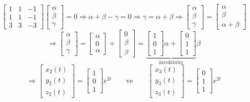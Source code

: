 \documentclass[11pt,a4paper]{article}
\begin{document}
\begin{cozum}
\[
\begin{bmatrix} 1 & 1 & -1 \\ 1 & 1 & -1 \\ 3 & 3 & -3 \end{bmatrix}\begin{bmatrix} \alpha \\ \beta \\ \gamma \end{bmatrix} = 0 \Rightarrow \alpha + \beta - \gamma = 0 \Rightarrow \gamma = \alpha + \beta \Rightarrow \begin{bmatrix} \alpha \\ \beta \\ \gamma \end{bmatrix} = \begin{bmatrix} \alpha \\ \beta \\ \alpha+\beta \end{bmatrix}
\]
\[
\Rightarrow \begin{bmatrix} \alpha \\ \beta \\ \gamma \end{bmatrix} = \begin{bmatrix} \alpha \\ 0 \\ \alpha \end{bmatrix} + \begin{bmatrix} 0 \\ \beta \\ \beta \end{bmatrix} = \underbrace{\begin{bmatrix} 1 \\ 0 \\ 1 \end{bmatrix}\alpha + \begin{bmatrix} 0 \\ 1 \\ 1 \end{bmatrix}}_{\text{özvektörler}}\beta
\]
\[
\Rightarrow \begin{bmatrix} x_2(t) \\ y_2(t) \\ z_2(t) \end{bmatrix} = \begin{bmatrix} 1 \\ 0 \\ 1 \end{bmatrix}e^{2t} \qquad \text{ve} \qquad \begin{bmatrix} x_3(t) \\ y_3(t) \\ z_3(t) \end{bmatrix} = \begin{bmatrix} 0 \\ 1 \\ 1 \end{bmatrix}e^{2t}
\]
\end{cozum}
\end{document}
